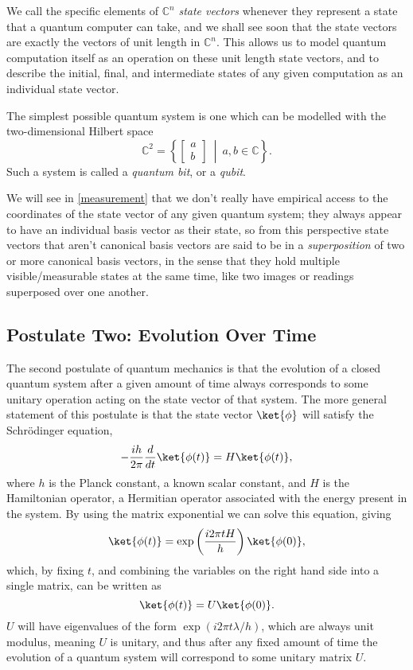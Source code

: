 We call the specific elements of $\mathbb{C}^n$ \emph{state vectors} whenever they represent a state that a quantum computer can take, and we shall see soon that the state vectors are exactly the vectors of unit length in $\mathbb{C}^n$. This allows us to model quantum computation itself as an operation on these unit length state vectors, and to describe the initial, final, and intermediate states of any given computation as an individual state vector.

The simplest possible quantum system is one which can be modelled with the two-dimensional Hilbert space
\[
\mathbb{C}^2 = \left\{\left[\begin{matrix}
a\\
b
\end{matrix}\right]\ \middle|\ a, b \in \mathbb{C}\right\}.
\]
Such a system is called a \emph{quantum bit}, or a \emph{qubit}.

We will see in \autoref{measurement} that we don't really have empirical access to the coordinates of the state vector of any given quantum system; they always appear to have an individual basis vector as their state, so from this perspective state vectors that aren't canonical basis vectors are said to be in a \emph{superposition} of two or more canonical basis vectors, in the sense that they hold multiple visible/measurable states at the same time, like two images or readings superposed over one another.

\subsection{Postulate Two: Evolution Over Time}\label{evolution}
The second postulate of quantum mechanics is that the evolution of a closed quantum system after a given amount of time always corresponds to some unitary operation acting on the state vector of that system. The more general statement of this postulate is that the state vector $\ket{\phi}$ will satisfy the Schrödinger equation,
\[-\frac{ih}{2\pi}\frac{d}{dt}\ket{\phi(t)} = H\ket{\phi(t)},\]
where $h$ is the Planck constant, a known scalar constant, and $H$ is the Hamiltonian operator, a Hermitian operator associated with the energy present in the system. By using the matrix exponential we can solve this equation, giving
\[\ket{\phi(t)} = \exp\left(\frac{i 2\pi tH}{h}\right)\ket{\phi(0)},\]
which, by fixing $t$, and combining the variables on the right hand side into a single matrix, can be written as
\[\ket{\phi(t)} = U\ket{\phi(0)}.\]
$U$ will have eigenvalues of the form $\exp(i2\pi t\lambda/h)$, which are always unit modulus, meaning $U$ is unitary, and thus after any fixed amount of time the evolution of a quantum system will correspond to some unitary matrix $U$.

